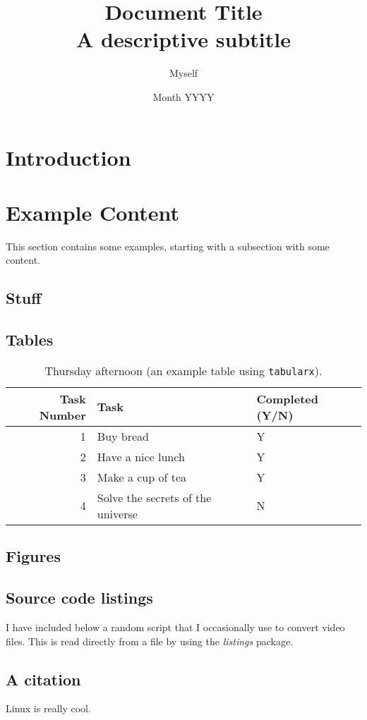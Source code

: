 \documentclass[a4paper, 12pt]{article}
\title{Document Title\\\large{A descriptive subtitle}}
\author{Myself}
\date{Month YYYY}
\begin{document}
	
\maketitle
\hrulefill
\tableofcontents
\newpage
{}

\section{Introduction}
\lipsum[1]

\section{Example Content}

This section contains some examples, starting with a subsection with some content.

\subsection{Stuff}
\lipsum[1]

\subsection{Tables}
\begin{table}[h]
    \centering
    \caption{Thursday afternoon (an example table using \texttt{tabularx}).}
    \begin{tabularx}{\linewidth}{r|X|l}
      \textbf{Task Number} & \textbf{Task} & \textbf{Completed (Y/N)} \\ \hline
      1   & Buy bread & Y \\ \hline
      2   & Have a nice lunch & Y \\ \hline
      3   & Make a cup of tea & Y \\ \hline
      4   & Solve the secrets of the universe & N
    \end{tabularx}
    \label{tab:thursday}
\end{table}

\subsection{Figures}

\subsection{Source code listings}
I have included below a random script that I occasionally use to convert video files. This is read directly from a file by using the \textit{listings} package.


\subsection{A citation}
Linux is really cool\cite{lunduke_half_2018}.

\printbibliography
\end{document}
